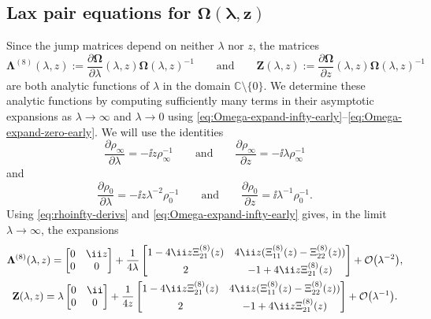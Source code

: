  \subsection[Lax pair equations for Omega (lambda,z)]{Lax pair equations for $\boldsymbol{\Omega(\lambda,z)}$}\label{sec:Lax-pair}

Since the jump matrices depend on neither $\lambda$ nor $z$, the matrices
\begin{equation}
 \mathbf{\Lambda}^{(8)}(\lambda,z):=\frac{\partial\mathbf{\Omega}}{\partial\lambda}(\lambda,z)\mathbf{\Omega}(\lambda,z)^{-1}\qquad\text{and}\qquad\mathbf{Z}(\lambda,z):=\frac{\partial\mathbf{\Omega}}{\partial z}(\lambda,z)\mathbf{\Omega}(\lambda,z)^{-1}
 \label{eq:Lambda-Z-def}
\end{equation}
are both analytic functions of $\lambda$ in the domain $\mathbb{C}\setminus\{0\}$.
We determine these analytic functions by computing sufficiently many terms in their asymptotic expansions as $\lambda\to\infty$ and $\lambda\to 0$ using \eqref{eq:Omega-expand-infty-early}--\eqref{eq:Omega-expand-zero-early}.
We will use the identities
\begin{equation}
 \frac{\partial\rho_\infty}{\partial\lambda} = -\ii z\rho_\infty^{-1}\qquad\text{and}\qquad\frac{\partial\rho_\infty}{\partial z} = -\ii\lambda\rho_\infty^{-1}
 \label{eq:rhoinfty-derivs}
\end{equation}
and
\begin{equation}
 \frac{\partial\rho_0}{\partial\lambda}=-\ii z\lambda^{-2}\rho_0^{-1}\qquad\text{and}\qquad\frac{\partial\rho_0}{\partial z} = \ii\lambda^{-1}\rho_0^{-1}.
 \label{eq:rhozero-derivs}
\end{equation}
Using \eqref{eq:rhoinfty-derivs} and \eqref{eq:Omega-expand-infty-early} gives, in the limit $\lambda\to\infty$, the expansions
\begin{gather}
 \mathbf{\Lambda}^{(8)}(\lambda,z)= \begin{bmatrix}0&{\ii z}{} \\0&0\end{bmatrix}
 +\frac{1}{4\lambda}\begin{bmatrix}1-{4\ii z}\Xi_{21}^{(8)}(z) & {4\ii z}{}(\Xi_{11}^{(8)}(z)-\Xi_{22}^{(8)}(z)) \vspace{1mm}\\ 2 &-1 +{4\ii z}\Xi_{21}^{(8)}(z)\end{bmatrix}+\mathcal{O}\big(\lambda^{-2}\big),\\
 \mathbf{Z}(\lambda,z)=
 \lambda\begin{bmatrix}0 & {\ii}{} \\0&0\end{bmatrix}
 +\frac{1}{4z}\begin{bmatrix}
 1-{4\ii z}\Xi_{21}^{(8)}(z) &{4\ii z}{}(\Xi_{11}^{(8)}(z)-\Xi_{22}^{(8)}(z)) \vspace{1mm}\\2 & -1+{4\ii z}\Xi_{21}^{(8)}(z)
 \end{bmatrix}
 +\mathcal{O}\big(\lambda^{-1}\big).
\label{eq:Lax-coefficients-infty}
\end{gather}
